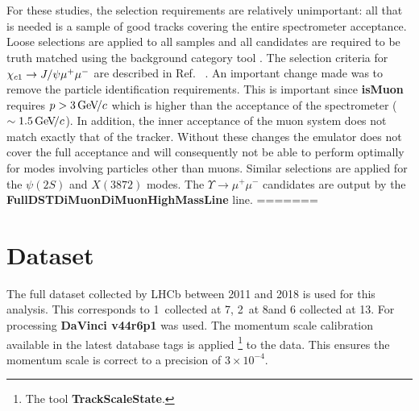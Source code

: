 For these studies, the selection requirements are relatively
unimportant: all that is needed is a sample of good tracks covering
the entire spectrometer acceptance.  Loose selections are applied to all samples and all candidates are
required to be truth matched using the background category tool
\cite{Gligorov:1035682}. The selection criteria for ${\chi_{{c} 1}} \rightarrow
J/\psi \mu^+ \mu^-$ are described in
Ref. ~\cite{Anderlini:2270922}. An important change made was to remove the
particle identification requirements.  This is important since
\textbf{isMuon} requires $p > 3 \text{\,Ge\kern -0.1em V\!/}c$ which is higher than the
acceptance of the spectrometer ($\sim 1.5 \text{\,Ge\kern -0.1em V\!/}c$). In addition, the inner
acceptance of the muon system does not match exactly that of the
tracker. Without these changes the emulator does not cover the full
acceptance and will consequently not be able to perform optimally for
modes involving particles other than muons.  Similar selections are applied for the $\psi(2S)$ and
$X(3872)$ modes. The $\Upsilon \rightarrow \mu^+ \mu^-$ candidates are
output by the \textbf{FullDSTDiMuonDiMuonHighMassLine} line.
=======
\section{Dataset}
\label{sec:dataset}
%
The full dataset collected by LHCb between 2011 and 2018 is used for
this analysis. This corresponds to 1~\invfb collected at 7\tev,
2~\invfb at 8\tev and 6 \invfb collected at 13\tev. For processing
\textbf{DaVinci v44r6p1} was used. The momentum scale calibration available in the latest database
tags is applied \footnote{The tool \textbf{TrackScaleState}.} to the data. This
ensures the momentum scale is correct to a precision of $3
\times 10^{-4}$.

